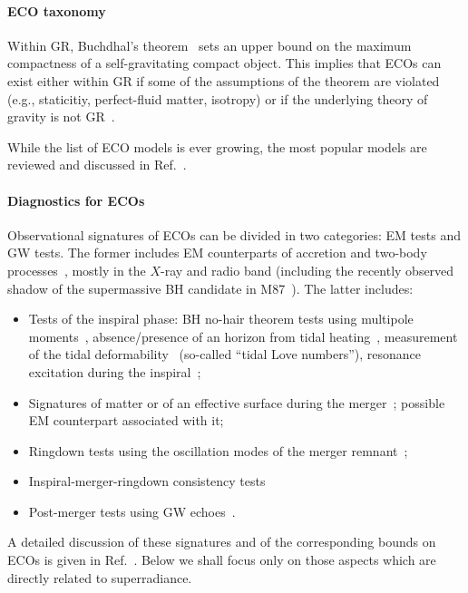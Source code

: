 \documentclass[11pt]{article}
\numberwithin{equation}{section} %
\begin{document}
\paragraph{ECO taxonomy}
Within GR, Buchdhal's theorem~\cite{Buchdahl:1959zz} sets an upper bound on the maximum compactness of a 
self-gravitating compact object. This implies that ECOs can exist either within GR if some of the assumptions of 
the theorem are 
violated (e.g., staticitiy, perfect-fluid matter, isotropy) or if the underlying theory of gravity is not 
GR~\cite{Cardoso:2019rvt}. 

While the list of ECO models is ever growing, the most popular models are reviewed and discussed in Ref.~\cite{Cardoso:2019rvt}. 
\paragraph{Diagnostics for ECOs}
Observational signatures of ECOs can be divided in two categories: {\rm EM tests} and {\rm GW tests}. The former 
includes EM counterparts of accretion and two-body processes~\cite{Broderick:2005xa,Broderick:2007ek,Lu:2017vdx}, 
mostly in the $X$-ray and radio band (including the 
recently observed shadow of the supermassive BH candidate in M87~\cite{Akiyama:2019cqa,Vincent:2015xta,Cunha:2018gql}). 
The latter includes:
\begin{itemize}
\item Tests of the inspiral phase: BH no-hair theorem tests using multipole 
moments~\cite{Krishnendu:2017shb,Raposo:2018xkf,Krishnendu:2018nqa,Pani:2015tga}, absence/presence of an 
horizon from tidal heating~\cite{Maselli:2017cmm,Datta:2019euh,Datta:2019epe}, measurement of the tidal 
deformability~\cite{Cardoso:2017cfl,Sennett:2017etc,Maselli:2017cmm,Pani:2019cyc} (so-called ``tidal Love 
numbers''), resonance excitation during the 
inspiral~\cite{Pani:2010em,Macedo:2013qea,Macedo:2013jja,Zhang:2018kib,Zhang:2019eid};
%
\item Signatures of matter or of an effective surface during the 
merger~\cite{Kesden:2004qx,Macedo:2013qea,Pani:2009ss,Barausse:2014tra,Cardoso:2014sna,Yunes:2009ke,Yunes:2016jcc}; 
possible EM counterpart associated with it;
%
\item Ringdown tests using the oscillation modes of the merger remnant~\cite{Berti:2005ys,Berti:2009kk,Berti:2006qt};
%
\item Inspiral-merger-ringdown consistency tests~\cite{TheLIGOScientific:2016src,Cabero:2017avf}
%
\item Post-merger tests using GW echoes~\cite{Cardoso:2016rao,Cardoso:2016oxy}.
\end{itemize}
A detailed discussion of these signatures and of the corresponding bounds on ECOs is given in 
Ref.~\cite{Cardoso:2019rvt}. Below we shall focus only on those aspects which are directly related to superradiance.
\end{document}
